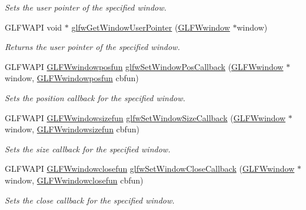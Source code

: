 \begin{CompactItemize}
\begin{CompactList}\small\item\em Sets the user pointer of the specified window. \item\end{CompactList}\item 
GLFWAPI void $\ast$ \hyperlink{group__window_g0a9ff3b4bf8589e9518e8816d06a8f50}{glfwGetWindowUserPointer} (\hyperlink{group__window_g3c96d80d363e67d13a41b5d1821f3242}{GLFWwindow} $\ast$window)
\begin{CompactList}\small\item\em Returns the user pointer of the specified window. \item\end{CompactList}\item 
GLFWAPI \hyperlink{group__window_g1c36e52549efd47790eb3f324da71924}{GLFWwindowposfun} \hyperlink{group__window_gea610899c4cb070dcd655c6de1fe1d2c}{glfwSetWindowPosCallback} (\hyperlink{group__window_g3c96d80d363e67d13a41b5d1821f3242}{GLFWwindow} $\ast$window, \hyperlink{group__window_g1c36e52549efd47790eb3f324da71924}{GLFWwindowposfun} cbfun)
\begin{CompactList}\small\item\em Sets the position callback for the specified window. \item\end{CompactList}\item 
GLFWAPI \hyperlink{group__window_gaca1c2715759d03da9834eac19323d4a}{GLFWwindowsizefun} \hyperlink{group__window_g150dad5f364425916c5816074cffa5e7}{glfwSetWindowSizeCallback} (\hyperlink{group__window_g3c96d80d363e67d13a41b5d1821f3242}{GLFWwindow} $\ast$window, \hyperlink{group__window_gaca1c2715759d03da9834eac19323d4a}{GLFWwindowsizefun} cbfun)
\begin{CompactList}\small\item\em Sets the size callback for the specified window. \item\end{CompactList}\item 
GLFWAPI \hyperlink{group__window_g07cff8bd3b3d573ecf49bb02d7669c1f}{GLFWwindowclosefun} \hyperlink{group__window_g5b827da350141c789acd64f5c4f7a0e1}{glfwSetWindowCloseCallback} (\hyperlink{group__window_g3c96d80d363e67d13a41b5d1821f3242}{GLFWwindow} $\ast$window, \hyperlink{group__window_g07cff8bd3b3d573ecf49bb02d7669c1f}{GLFWwindowclosefun} cbfun)
\begin{CompactList}\small\item\em Sets the close callback for the specified window. \item\end{CompactList}\item 

\end{CompactItemize}
